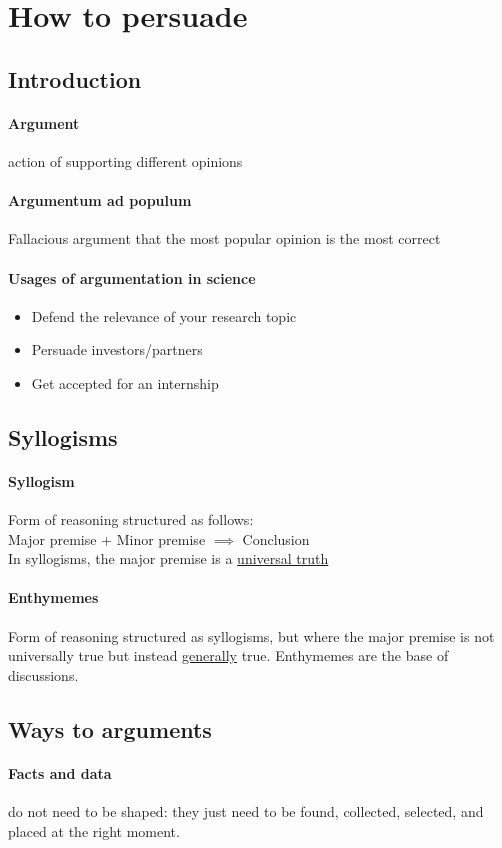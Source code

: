 \documentclass{article}
\begin{document}
\section{How to persuade}
\subsection{Introduction}
\paragraph{Argument} action of supporting different opinions
\paragraph{Argumentum ad populum} Fallacious argument that the most popular opinion is the most correct
\paragraph{Usages of argumentation in science}
\begin{itemize}
	\item Defend the relevance of your research topic
	\item Persuade investors/partners
	\item Get accepted for an internship
\end{itemize}
\subsection{Syllogisms}
\paragraph{Syllogism} Form of reasoning structured as follows:\\
Major premise + Minor premise $\implies$ Conclusion\\
In syllogisms, the major premise is a \underline{universal truth}
\paragraph{Enthymemes} Form of reasoning structured as syllogisms, but where the major premise is not universally true but instead \underline{generally} true. Enthymemes are the base of discussions.
\subsection{Ways to arguments} 
\paragraph{Facts and data} do not need to be shaped: they just need to be found, collected, selected, and placed at the right moment.
\end{document}

